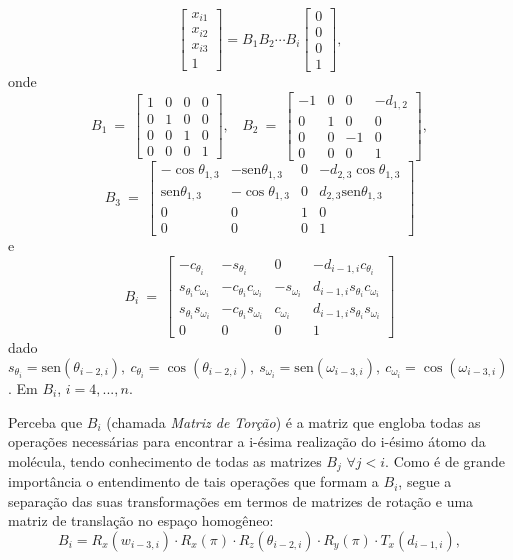 $$
\begin{bmatrix}
	x_{i1}\\ 
	x_{i2}\\ 
	x_{i3}\\ 
	1
\end{bmatrix}
= B_{1}B_{2}\cdots B_{i}\begin{bmatrix}
	0\\ 
	0\\ 
	0\\ 
	1
\end{bmatrix},
$$
onde
$$
B_1\: =\:
\begin{bmatrix}
	1 & 0 & 0 & 0\\ 
	0 & 1 & 0 & 0\\ 
	0 & 0 & 1 & 0\\ 
	0 & 0 & 0 & 1
\end{bmatrix},\:\:\:
\: B_2\: =\:
\begin{bmatrix}
	-1 & 0 & 0 & -d_{1,2}\\
	0 & 1 & 0 & 0\\ 
	0 & 0 & -1 & 0\\ 
	0 & 0 & 0 & 1
\end{bmatrix},
$$
$$
B_3\:=\:
\begin{bmatrix}
	-\cos\theta_{1,3} & -\mbox{sen}\theta_{1,3} & 0 & -d_{2,3}\cos\theta_{1,3}\\ 
	\mbox{sen}\theta_{1,3} & -\cos\theta_{1,3} & 0 & d_{2,3}\mbox{sen}\theta_{1,3}\\ 
	0 & 0 & 1 & 0\\ 
	0 & 0 & 0 & 1
\end{bmatrix}
$$
e
$$
B_i\:=\:
\begin{bmatrix}
	-c_{\theta_{i}} & -s_{\theta_{i}} & 0 & -d_{i-1,i}c_{\theta_{i}}\\ 
	s_{\theta_{i}}c_{\omega_{i}} & -c_{\theta_{i}}c_{\omega_{i}}
	& -s_{\omega_{i}} & d_{i-1,i}s_{\theta_{i}}c_{\omega_{i}}\\ 
	s_{\theta_{i}}s_{\omega_{i}} & -c_{\theta_{i}}s_{\omega_{i}} & c_{\omega_{i}} & d_{i-1,i}s_{\theta_{i}}s_{\omega_{i}}\\ 
	0 & 0 & 0 & 1
\end{bmatrix}
$$
dado $s_{\theta_{i}}=\mbox{sen} (\theta_{i-2, i}),\: c_{\theta_{i}}=\cos (\theta_{i-2, i}),\: s_{\omega_{i}}=\mbox{sen} (\omega_{i-3, i}),\: c_{\omega_{i}}=\cos (\omega_{i-3, i})$. Em $B_i$, $i=4, ..., n$.


Perceba que $B_i$ (chamada \textit{Matriz de Torção}) é a matriz que engloba todas as operações necessárias para encontrar a i-ésima realização do i-ésimo átomo da molécula, tendo conhecimento de todas as matrizes $B_j$ $\forall j < i$. Como é de grande importância o entendimento de tais operações que formam a $B_i$, segue a separação das suas transformações em termos de matrizes de rotação e uma matriz de translação no espaço homogêneo:
$$
B_i=R_{x}(w_{i-3,i})\cdot R_{x}(\pi)\cdot R_{z}(\theta_{i-2,i})\cdot R_{y}(\pi)\cdot T_{x}(d_{i-1,i}),
$$

